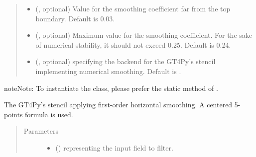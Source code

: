 \documentclass[letterpaper,10pt,english]{sphinxmanual}
\begin{document}
\begin{fulllineitems}
\begin{fulllineitems}
\begin{quote}
\begin{description}
\begin{itemize}
\item {} 
 (, optional) \textendash{} Value for the smoothing coefficient far from the top boundary. Default is 0.03.

\item {} 
 (, optional) \textendash{} Maximum value for the smoothing coefficient. For the sake of numerical stability, it should not
exceed 0.25. Default is 0.24.

\item {} 
 (, optional) \textendash{}  specifying the backend for the GT4Py’s stencil implementing numerical
smoothing. Default is .

\end{itemize}

\end{description}\end{quote}

\begin{sphinxadmonition}{note}{Note:}
To instantiate the class, please prefer the static method 
of {\hyperref[\detokenize{api:dycore.horizontal_smoothing.HorizontalSmoothing}]{}}.
\end{sphinxadmonition}

\end{fulllineitems}


\begin{fulllineitems}
\label{\detokenize{api:dycore.horizontal_smoothing.HorizontalSmoothingFirstOrderXYZ._stencil_defs}}
The GT4Py’s stencil applying first-order horizontal smoothing. A centered 5-points formula is used.
\begin{quote}\begin{description}
\item[{Parameters}] \leavevmode\begin{itemize}
\item {} 
 () \textendash{}  representing the input field to filter.


\end{itemize}
\end{description}
\end{quote}
\end{fulllineitems}
\end{fulllineitems}
\end{document}
